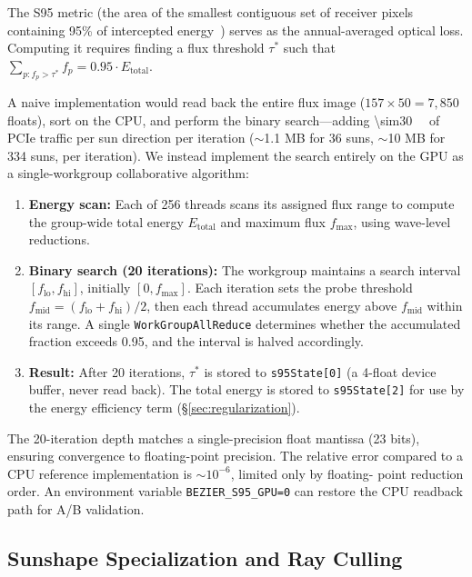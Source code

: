 \documentclass{CVM}
\begin{document}
The S95 metric (the area of the smallest contiguous set of receiver pixels
containing 95\% of intercepted energy~\cite{s95definition}) serves as the
annual-averaged optical loss. Computing it requires finding a flux threshold
$\tau^*$ such that $\sum_{p: f_p > \tau^*} f_p = 0.95 \cdot E_{\text{total}}$.

A naive implementation would read back the entire flux image ($157\times50 =
7{,}850$ floats), sort on the CPU, and perform the binary search---adding
\SI{\sim30}{\kilo\byte} of PCIe traffic per sun direction per iteration
($\sim$1.1 MB for 36 suns, $\sim$10 MB for 334 suns, per iteration). We
instead implement the search entirely on the GPU as a single-workgroup
collaborative algorithm:

\begin{enumerate}
  \item \textbf{Energy scan:} Each of 256 threads scans its assigned flux
  range to compute the group-wide total energy $E_{\text{total}}$ and maximum
  flux $f_{\max}$, using wave-level reductions.

  \item \textbf{Binary search (20 iterations):} The workgroup maintains a
  search interval $[f_{\text{lo}}, f_{\text{hi}}]$, initially
  $[0, f_{\max}]$. Each iteration sets the probe threshold
  $f_{\text{mid}} = (f_{\text{lo}} + f_{\text{hi}})/2$, then each thread
  accumulates energy above $f_{\text{mid}}$ within its range. A single
  \verb|WorkGroupAllReduce| determines whether the accumulated fraction
  exceeds 0.95, and the interval is halved accordingly.

  \item \textbf{Result:} After 20 iterations, $\tau^*$ is stored to
  \verb|s95State[0]| (a 4-float device buffer, never read back). The total
  energy is stored to \verb|s95State[2]| for use by the energy efficiency
  term (\S\ref{sec:regularization}).
\end{enumerate}

The 20-iteration depth matches a single-precision float mantissa (23 bits),
ensuring convergence to floating-point precision. The relative error compared
to a CPU reference implementation is $\sim 10^{-6}$, limited only by floating-
point reduction order. An environment variable \verb|BEZIER_S95_GPU=0| can
restore the CPU readback path for A/B validation.

\subsection{Sunshape Specialization and Ray Culling}
\label{sec:optimizations}
\end{document}

